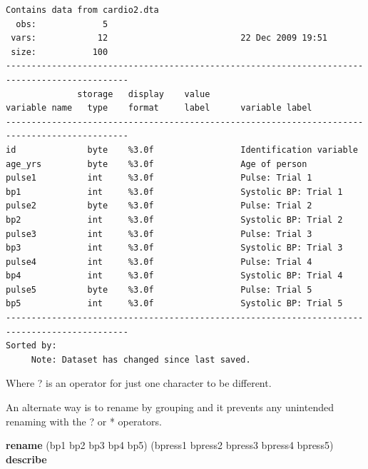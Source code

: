 \documentclass[
]{book}
\newenvironment{Shaded}{\begin{snugshade}}{\end{snugshade}}
\newcommand{\KeywordTok}[1]{\textcolor[rgb]{0.13,0.29,0.53}{\textbf{#1}}}
\newcommand{\NormalTok}[1]{#1}
\begin{document}
\begin{verbatim}
Contains data from cardio2.dta
  obs:             5                          
 vars:            12                          22 Dec 2009 19:51
 size:           100                          
----------------------------------------------------------------------------------------------
              storage   display    value
variable name   type    format     label      variable label
----------------------------------------------------------------------------------------------
id              byte    %3.0f                 Identification variable
age_yrs         byte    %3.0f                 Age of person
pulse1          int     %3.0f                 Pulse: Trial 1
bp1             int     %3.0f                 Systolic BP: Trial 1
pulse2          byte    %3.0f                 Pulse: Trial 2
bp2             int     %3.0f                 Systolic BP: Trial 2
pulse3          int     %3.0f                 Pulse: Trial 3
bp3             int     %3.0f                 Systolic BP: Trial 3
pulse4          int     %3.0f                 Pulse: Trial 4
bp4             int     %3.0f                 Systolic BP: Trial 4
pulse5          byte    %3.0f                 Pulse: Trial 5
bp5             int     %3.0f                 Systolic BP: Trial 5
----------------------------------------------------------------------------------------------
Sorted by: 
     Note: Dataset has changed since last saved.
\end{verbatim}

Where ? is an operator for just one character to be different.

An alternate way is to rename by grouping and it prevents any unintended renaming with the ? or * operators.

\begin{Shaded}
\begin{Highlighting}[]
\KeywordTok{rename}\NormalTok{ (bp1 bp2 bp3 bp4 bp5) (bpress1 bpress2 bpress3 bpress4 bpress5)}
\KeywordTok{describe}
\end{Highlighting}
\end{Shaded}
\end{document}
